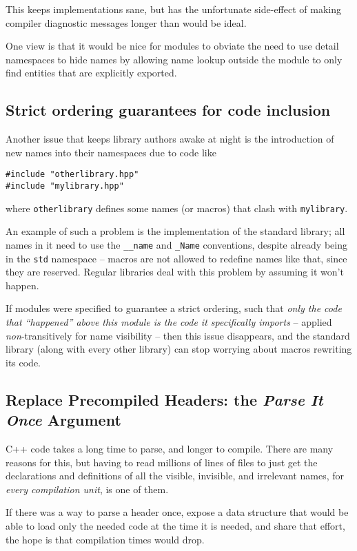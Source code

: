 \documentclass[reqno]{article}
\begin{document}
This keeps implementations sane, but has the unfortunate side-effect of making
compiler diagnostic messages longer than would be ideal.

One view is that it would be nice for modules to obviate the need to use detail
namespaces to hide names by allowing name lookup outside the module to only
find entities that are explicitly exported.


\subsection{Strict ordering guarantees for code inclusion}

Another issue that keeps library authors awake at night is the introduction of
new names into their namespaces due to code like

\begin{verbatim}
#include "otherlibrary.hpp"
#include "mylibrary.hpp"
\end{verbatim}

where \texttt{otherlibrary} defines some names (or macros) that clash with
\texttt{mylibrary}.

An example of such a problem is the implementation of the standard library; all
names in it need to use the \texttt{\_\_name} and \texttt{\_Name} conventions,
despite already being in the \texttt{std} namespace -- macros are not allowed
to redefine names like that, since they are reserved. Regular libraries deal
with this problem by assuming it won't happen.

If modules were specified to guarantee a strict ordering, such that \emph{only
the code that ``happened'' above this module is the code it specifically
imports} -- applied \emph{non}-transitively for name visibility -- then this
issue disappears, and the standard library (along with every other library) can
stop worrying about macros rewriting its code.


\subsection{Replace Precompiled Headers: the \emph{Parse It Once} Argument}

C++ code takes a long time to parse, and longer to compile. There are many
reasons for this, but having to read millions of lines of files to just get the
declarations and definitions of all the visible, invisible, and irrelevant
names, for \emph{every compilation unit}, is one of them.

If there was a way to parse a header once, expose a data structure that would be
able to load only the needed code at the time it is needed, and share that
effort, the hope is that compilation times would drop.
\end{document}
